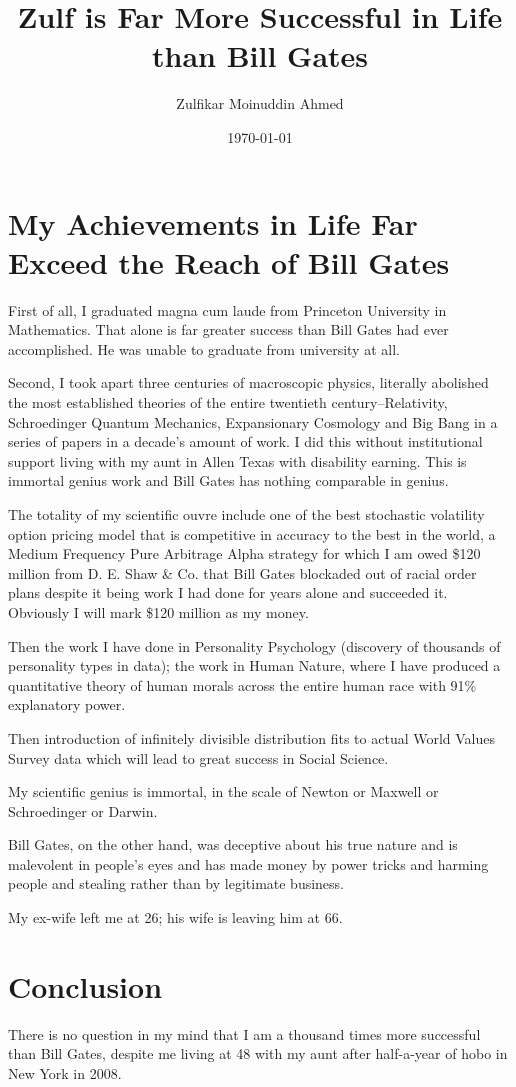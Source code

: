 \documentclass{amsart}
\title{Zulf is Far More Successful in Life than Bill Gates}
\author{Zulfikar Moinuddin Ahmed}
\date{\today}
\begin{document}
\maketitle

\section{My Achievements in Life Far Exceed the Reach of Bill Gates}

First of all, I graduated magna cum laude from Princeton University in Mathematics.  That alone is far greater success than Bill Gates had ever accomplished.  He was unable to graduate from university at all.

Second, I took apart three centuries of macroscopic physics, literally abolished the most established theories of the entire twentieth century--Relativity, Schroedinger Quantum Mechanics, Expansionary Cosmology and Big Bang in a series of papers in a decade's amount of work.  I did this without institutional support living with my aunt in Allen Texas with disability earning.  This is immortal genius work and Bill Gates has nothing comparable in genius. 

The totality of my scientific ouvre include one of the best stochastic volatility option pricing model that is competitive in accuracy to the best in the world, a Medium Frequency Pure Arbitrage Alpha strategy for which I am owed \$120 million from D. E. Shaw \& Co. that Bill Gates blockaded out of racial order plans despite it being work I had done for years alone and succeeded it.  Obviously I will mark \$120 million as my money.

Then the work I have done in Personality Psychology (discovery of thousands of personality types in data); the work in Human Nature, where I have produced a quantitative theory of human morals across the entire human race with 91\% explanatory power.

Then introduction of infinitely divisible distribution fits to actual World Values Survey data which will lead to great success in Social Science.  

My scientific genius is immortal, in the scale of Newton or Maxwell or Schroedinger or Darwin.

Bill Gates, on the other hand, was deceptive about his true nature and is malevolent in people's eyes and has made money by power tricks and harming people and stealing rather than by legitimate business.  

My ex-wife left me at 26; his wife is leaving him at 66.

\section{Conclusion}

There is no question in my mind that I am a thousand times more successful than Bill Gates, despite me living at 48 with my aunt after half-a-year of hobo in New York in 2008.
\end{document}
